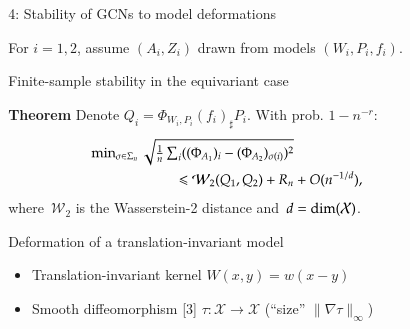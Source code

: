 \documentclass[final,dvipsnames]{beamer}
\newcommand{\vsp}{\vspace{10pt}}
\newcommand{\mycolback}[1]{
\hspace*{.01\linewidth}\begin{minipage}{.96\linewidth}
\begin{mdframed}[backgroundcolor=blue!10,linewidth=0pt]
\vsp
#1
\vsp
\end{mdframed}
\end{minipage}
}
\begin{document}
\begin{frame}{}
\begin{columns}[t]
\begin{column}{0.45\linewidth}
\end{column}




















\begin{column}{0.29\linewidth}
\begin{myalertblock}{4: Stability of GCNs to model deformations}

For $i = 1,2$, assume $(A_{i},Z_{i})$ drawn from models $(W_{i}, P_{i}, f_{i})$.

\hspace*{.01\linewidth}\begin{minipage}{.96\linewidth}
\begin{mynotablock}{Finite-sample stability in the equivariant case}

\mycolback{
  \textbf{Theorem}
  Denote $Q_i = \Phi_{W_i,P_i}(f_i)_\sharp P_i$. With prob. $1-n^{-r}$:
  \begin{align*}
  &\mathsmaller{\min_{\sigma \in \Sigma_n} \sqrt{\frac{1}{n} \sum_i ((\Phi_{A_1})_i - (\Phi_{A_2})_{\sigma(i)})^2}} \\
    &\qquad  \qquad \qquad \leq \mathcal{W}_2(Q_1,Q_2) + R_n + O(n^{-1/d}),
  \end{align*}
  where~$\mathcal{W}_2$ is the Wasserstein-2 distance and~$d = \text{dim}(\mathcal{X})$.
}

\end{mynotablock}
\end{minipage}

\vspace{0.5cm}

\hspace*{.01\linewidth}\begin{minipage}{.96\linewidth}
\begin{mynotablock}{Deformation of a translation-invariant model}
\begin{itemize}
  \item Translation-invariant kernel $W(x,y) = w(x-y)$
  \item Smooth diffeomorphism [3] $\tau: \mathcal{X} \to \mathcal{X}$ (``size'' $\|\nabla \tau\|_\infty$)
\end{itemize}


\end{mynotablock}
\end{minipage}
\end{myalertblock}
\end{column}
\end{columns}
\end{frame}
\end{document}
